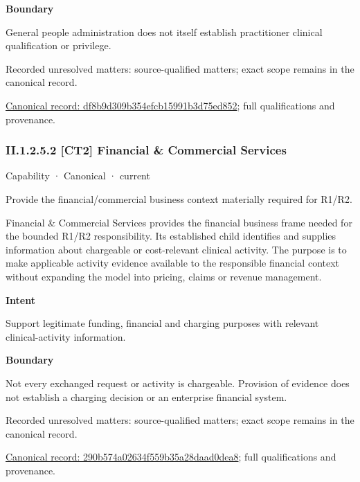 \textbf{Boundary}



General people administration does not itself establish practitioner clinical qualification or privilege.


{\small Recorded unresolved matters: source-qualified matters; exact scope remains in the canonical record.}\par
{\footnotesize \href{../../../../continuum/strategy/capability/df8b9d309b354efcb15991b3d75ed852.md}{Canonical record: df8b9d309b354efcb15991b3d75ed852}; full qualifications and provenance.}\par
\subsubsection*{II.1.2.5.2 [CT2] Financial \& Commercial Services}
\label{navigation:II.1.2.5.2}

\label{element:290b574a02634f559b35a28daad0dea8}
{\small Capability · Canonical · current}\par

Provide the financial/commercial business context materially required for R1/R2.



Financial \& Commercial Services provides the financial business frame needed for the bounded R1/R2 responsibility. Its established child identifies and supplies information about chargeable or cost-relevant clinical activity. The purpose is to make applicable activity evidence available to the responsible financial context without expanding the model into pricing, claims or revenue management.



\textbf{Intent}



Support legitimate funding, financial and charging purposes with relevant clinical-activity information.



\textbf{Boundary}



Not every exchanged request or activity is chargeable. Provision of evidence does not establish a charging decision or an enterprise financial system.


{\small Recorded unresolved matters: source-qualified matters; exact scope remains in the canonical record.}\par
{\footnotesize \href{../../../../continuum/strategy/capability/290b574a02634f559b35a28daad0dea8.md}{Canonical record: 290b574a02634f559b35a28daad0dea8}; full qualifications and provenance.}\par
